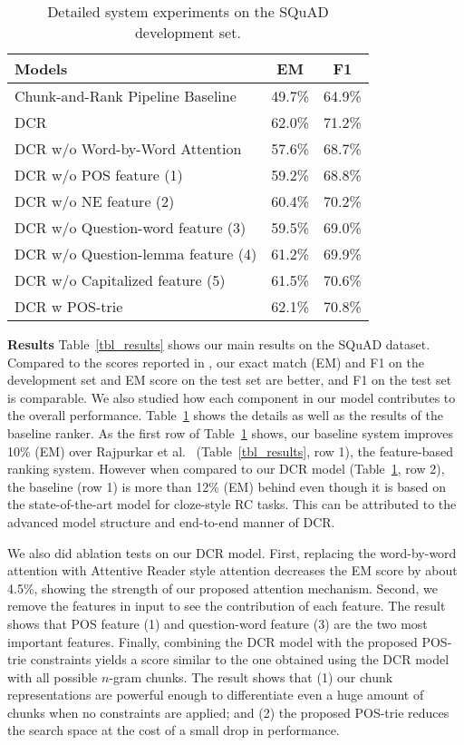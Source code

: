 \documentclass[letterpaper]{article}
\begin{document}
\begin{table}
\caption{Detailed system experiments on the SQuAD development set.}
\label{tbl_ablation}
\centering
\begin{tabular}{lcc}
\hline
Models&EM&F1\\
\hline
Chunk-and-Rank Pipeline Baseline &49.7\%&64.9\%\\
\hline
DCR&62.0\%&71.2\%\\
DCR w/o Word-by-Word Attention &57.6\%&68.7\%\\
DCR w/o POS feature (1) &59.2\%&68.8\%\\
DCR w/o NE feature (2) &60.4\%&70.2\%\\
DCR w/o Question-word feature (3) &59.5\% &69.0\%\\
DCR w/o Question-lemma feature (4) & 61.2\%&69.9\%\\
DCR w/o Capitalized feature (5) & 61.5\%&70.6\%\\
\hline
DCR w POS-trie &62.1\% &70.8\% \\
\hline
\end{tabular}
\end{table}

\noindent\textbf{Results}
Table~\ref{tbl_results} shows our main results on the SQuAD dataset. Compared to the scores reported in \cite{wang2016machine}, our exact match (EM) and F1 on the development set and EM score on the test set are better, and F1 on the test set is comparable. We also studied how each component in our model contributes to the overall performance. Table~\ref{tbl_ablation} shows the details as well as the results of the baseline ranker.
As the first row of Table~\ref{tbl_ablation} shows, our baseline system improves 10\% (EM) over Rajpurkar et al.~ (Table~\ref{tbl_results}, row 1), the feature-based ranking system. 
However when compared to our DCR model (Table~\ref{tbl_ablation}, row 2), the baseline (row 1) is more than 12\% (EM) behind even though it is based on the state-of-the-art model for cloze-style RC tasks. This can be attributed to the advanced model structure and end-to-end manner of DCR.


We also did ablation tests on our DCR model. First, replacing the word-by-word attention with Attentive Reader style attention \cite{hermann2015teaching} decreases the EM score by about 4.5\%, showing the strength of our proposed attention mechanism. 
Second, we remove the features in input to see the contribution of each feature. The result shows that POS feature (1) and question-word feature (3) are the two most important features.
Finally, combining the DCR model with the proposed POS-trie constraints yields a score similar to the one obtained using the DCR model with all possible $n$-gram chunks. The result shows that (1) our chunk representations are powerful enough to differentiate even a huge amount of chunks when no constraints are applied; and (2) the proposed POS-trie reduces the search space at the cost of a small drop in performance.
\end{document}
